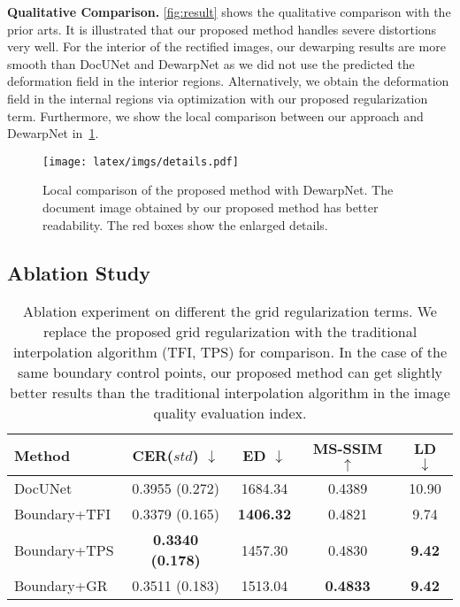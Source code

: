\documentclass[10pt,twocolumn,letterpaper]{article}
\newcommand{\myparagraph}[1]{\vspace{1pt} \noindent \textbf{#1} }
\begin{document}
\myparagraph{Qualitative Comparison.} \cref{fig:result} shows the qualitative comparison with the prior arts. It is illustrated that our proposed method handles severe distortions very well. For the interior of the rectified images, our dewarping results are more smooth than DocUNet and DewarpNet as we did not use the predicted the deformation field in the interior regions. Alternatively, we obtain the deformation field in the internal regions via optimization with our proposed regularization term. Furthermore, we show the local comparison between our approach and DewarpNet in~\cref{fig:details}. 











\begin{figure}[t]
  \centering
\texttt{[image: latex/imgs/details.pdf]}
  \vspace{-2mm}
  \caption{Local comparison of the proposed method with DewarpNet. The document image obtained by our proposed method has better readability. The red boxes show the enlarged details.}
  \label{fig:details}
\end{figure}

\subsection{Ablation Study}
\begin{table}
\scriptsize
  \centering
  \caption{Ablation experiment on different the grid regularization terms. We replace the proposed grid regularization with the traditional interpolation algorithm (TFI, TPS) for comparison. In the case of the same boundary control points, our proposed method can get slightly better results than the traditional interpolation algorithm in the image quality evaluation index.}
  \vspace{-2mm}
  \begin{tabular}{lcccc}
    \toprule
    \textbf{Method} &  \textbf{CER}($std$) $\downarrow$ & \textbf{ED} $\downarrow$ &\textbf{MS-SSIM} $\uparrow$ & \textbf{LD} $\downarrow$\\
    \midrule
    DocUNet & 0.3955 (0.272) & 1684.34 & 0.4389 & 10.90\\
    Boundary+TFI & 0.3379 (0.165) & \textbf{1406.32} &0.4821& 9.74\\  
    Boundary+TPS & \textbf{0.3340 (0.178)} & 1457.30 & 0.4830 & \textbf{9.42}\\ 
    Boundary+GR  & 0.3511 (0.183) & 1513.04 & \textbf{0.4833} &  \textbf{9.42}\\ 
    \bottomrule
  \end{tabular}
  \label{tab:Ablation1}
\end{table}
\end{document}
